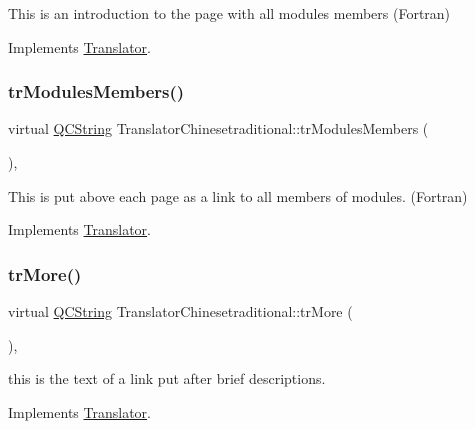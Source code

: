 This is an introduction to the page with all modules members (Fortran) 

Implements \mbox{\hyperlink{class_translator}{Translator}}.

\mbox{\label{class_translator_chinesetraditional_af13e010ffc89e71b48880caec4e508d1}} 
\subsubsection{\texorpdfstring{trModulesMembers()}{trModulesMembers()}}
{\footnotesize\ttfamily virtual \mbox{\hyperlink{class_q_c_string}{Q\+C\+String}} Translator\+Chinesetraditional\+::tr\+Modules\+Members (\begin{DoxyParamCaption}{ }\end{DoxyParamCaption})\hspace{0.3cm}{\ttfamily [inline]}, {\ttfamily [virtual]}}

This is put above each page as a link to all members of modules. (Fortran) 

Implements \mbox{\hyperlink{class_translator}{Translator}}.

\mbox{\label{class_translator_chinesetraditional_ad91d5ea9f31d47efac43960215ce6179}} 
\subsubsection{\texorpdfstring{trMore()}{trMore()}}
{\footnotesize\ttfamily virtual \mbox{\hyperlink{class_q_c_string}{Q\+C\+String}} Translator\+Chinesetraditional\+::tr\+More (\begin{DoxyParamCaption}{ }\end{DoxyParamCaption})\hspace{0.3cm}{\ttfamily [inline]}, {\ttfamily [virtual]}}

this is the text of a link put after brief descriptions. 

Implements \mbox{\hyperlink{class_translator}{Translator}}.

\mbox{\label{class_translator_chinesetraditional_a0bf83ac2c861396dfc2d3c274ad45fa4}} 

